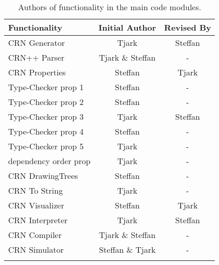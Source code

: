 \documentclass[12pt,a4paper]{report}
\begin{document}
\begin{longtable}{|l|c|c|}\hline
\textbf{Functionality} & \textbf{Initial Author} & \textbf{Revised By} \\\hline
CRN Generator & Tjark & Steffan \\
CRN++ Parser & Tjark \& Steffan & -\\
CRN Properties & Steffan & Tjark \\
Type-Checker prop 1 & Steffan & - \\
Type-Checker prop 2 & Steffan & - \\
Type-Checker prop 3 & Tjark & Steffan \\
Type-Checker prop 4 & Steffan & - \\
Type-Checker prop 5 & Tjark & - \\
dependency order prop & Tjark & - \\
CRN DrawingTrees & Steffan & - \\
CRN To String & Tjark & - \\
CRN Visualizer & Steffan & Tjark \\
CRN Interpreter & Tjark & Steffan \\
CRN Compiler & Tjark \& Steffan & - \\
CRN Simulator & Steffan \& Tjark & -\\\hline
\caption{Authors of functionality in the main code modules.}
\label{tab:functions}
\end{longtable}
\end{document}
